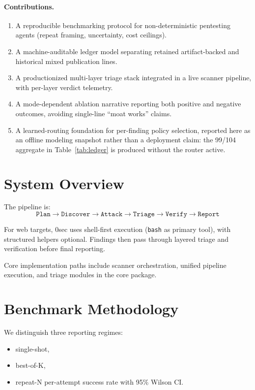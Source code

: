 \documentclass[11pt]{article}
\begin{document}
\paragraph{Contributions.}
\begin{enumerate}[leftmargin=*,itemsep=2pt]
  \item A reproducible benchmarking protocol for non-deterministic pentesting
  agents (repeat framing, uncertainty, cost ceilings).
  \item A machine-auditable ledger model separating retained artifact-backed and
  historical mixed publication lines.
  \item A productionized multi-layer triage stack integrated in a live scanner
  pipeline, with per-layer verdict telemetry.
  \item A mode-dependent ablation narrative reporting both positive and negative
  outcomes, avoiding single-line ``moat works'' claims.
  \item A learned-routing foundation for per-finding policy selection,
  reported here as an offline modeling snapshot rather than a deployment
  claim: the 99/104 aggregate in Table~\ref{tab:ledger} is produced
  without the router active.
\end{enumerate}

\section{System Overview}

The pipeline is:
\[
\texttt{Plan} \rightarrow \texttt{Discover} \rightarrow \texttt{Attack} \rightarrow \texttt{Triage} \rightarrow \texttt{Verify} \rightarrow \texttt{Report}
\]

For web targets, 0sec uses shell-first execution (\texttt{bash} as primary
tool), with structured helpers optional. Findings then pass through layered
triage and verification before final reporting.

Core implementation paths include scanner orchestration, unified pipeline
execution, and triage modules in the core package.

\section{Benchmark Methodology}

We distinguish three reporting regimes:
\begin{itemize}
  \item single-shot,
  \item best-of-K,
  \item repeat-N per-attempt success rate with 95\% Wilson CI.
\end{itemize}
\end{document}
